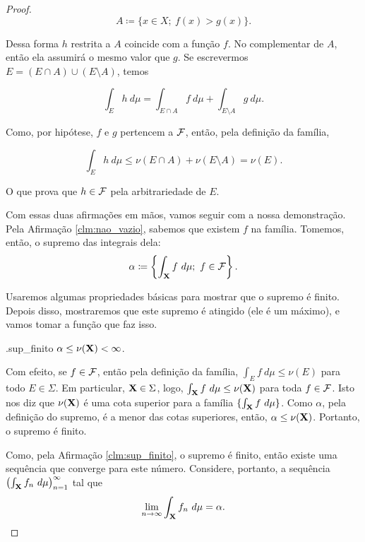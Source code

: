 \begin{proof}
    \begin{equation*}
        A\coloneq \{x\in X; \ f(x)> g(x)\}.
    \end{equation*}

    Dessa forma $h$ restrita a $A$ coincide com a função $f$. No complementar de $A$, então ela assumirá o mesmo valor que $g$. Se escrevermos $E=(E\cap A) \cup (E\setminus A)$, temos

    \begin{equation*}
        \int_E h \ d\mu = \int_{E\cap A} f\  d\mu + \int_{E\setminus A} g \ d\mu.
    \end{equation*}

    Como, por hipótese, $f$ e $g$ pertencem a $\mathcal{F}$, então, pela definição da família,

    \begin{equation*}
        \int_E h \ d\mu \leq \nu(E\cap A) + \nu(E\setminus A) = \nu (E).
    \end{equation*}

    O que prova que $h\in\mathcal{F}$ pela arbitrariedade de $E$.

    Com essas duas afirmações em mãos, vamos seguir com a nossa demonstração. Pela Afirmação \ref{clm:nao_vazio}, sabemos que existem $f$ na família. Tomemos, então, o supremo das integrais dela:
    \begin{equation*}
        \alpha \coloneq \left\{\int_{\X} f\ d\mu; \ f\in\F\right\}.
    \end{equation*}

    Usaremos algumas propriedades básicas para mostrar que o supremo é finito. Depois disso, mostraremos que este supremo é atingido (ele é um máximo), e vamos tomar a função que faz isso.
    
    \begin{claim}{.}{sup_finito}
        $\alpha \leq \nu(\mathbf{X}) < \infty$.
    \end{claim}

    Com efeito, se $f\in\mathcal{F}$, então pela definição da família, $\int_E f \ d\mu\leq \nu(E)$ para todo $E\in\Sigma$. Em particular, $\mathbf{X} \in \Sigma$, logo, $\int_{\mathbf{X}} f \ d\mu \leq \nu(\mathbf{X}) $ para toda $f\in\mathcal{F}$. Isto nos diz que $\nu(\mathbf{X})$ é uma cota superior para a família $\{\int_{\mathbf{X}} f \ d\mu\}$. Como $\alpha$, pela definição do supremo, é a menor das cotas superiores, então, $\alpha \leq \nu(\mathbf{X})$. Portanto, o supremo é finito.

    Como, pela Afirmação \ref{clm:sup_finito}, o supremo é finito, então existe uma sequência que converge para este número. Considere, portanto, a sequência $\left(\int_{\X} f_n \ d\mu\right)_{n=1}^{\infty}$ tal que
    \begin{equation}\label{def:fn_lim}
        \lim_{n\to \infty} \int_{\mathbf{X}} f_n \ d\mu = \alpha.
    \end{equation}


\end{proof}
